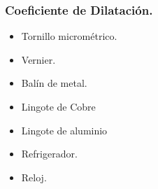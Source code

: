         \subsubsection{Coeficiente de Dilatación.}
            \begin{itemize}
                \item Tornillo micrométrico.
                \item Vernier.
                \item Balín de metal.
                \item Lingote de Cobre
                \item Lingote de aluminio
                \item Refrigerador.
                \item Reloj.
            \end{itemize}
